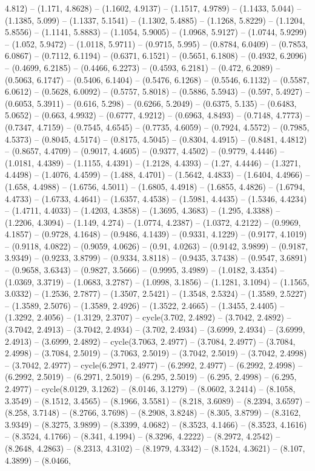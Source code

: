 4.812) -- (1.171, 4.8628) -- (1.1602, 4.9137) -- (1.1517, 4.9789) -- (1.1433, 5.044) -- (1.1385, 5.099) -- (1.1337, 5.1541) -- (1.1302, 5.4885) -- (1.1268, 5.8229) -- (1.1204, 5.8556) -- (1.1141, 5.8883) -- (1.1054, 5.9005) -- (1.0968, 5.9127) -- (1.0744, 5.9299) -- (1.052, 5.9472) -- (1.0118, 5.9711) -- (0.9715, 5.995) -- (0.8784, 6.0409) -- (0.7853, 6.0867) -- (0.7112, 6.1194) -- (0.6371, 6.1521) -- (0.5651, 6.1808) -- (0.4932, 6.2096) -- (0.4699, 6.2185) -- (0.4466, 6.2273) -- (0.4593, 6.2181) -- (0.472, 6.2089) -- (0.5063, 6.1747) -- (0.5406, 6.1404) -- (0.5476, 6.1268) -- (0.5546, 6.1132) -- (0.5587, 6.0612) -- (0.5628, 6.0092) -- (0.5757, 5.8018) -- (0.5886, 5.5943) -- (0.597, 5.4927) -- (0.6053, 5.3911) -- (0.616, 5.298) -- (0.6266, 5.2049) -- (0.6375, 5.135) -- (0.6483, 5.0652) -- (0.663, 4.9932) -- (0.6777, 4.9212) -- (0.6963, 4.8493) -- (0.7148, 4.7773) -- (0.7347, 4.7159) -- (0.7545, 4.6545) -- (0.7735, 4.6059) -- (0.7924, 4.5572) -- (0.7985, 4.5373) -- (0.8045, 4.5174) -- (0.8175, 4.5045) -- (0.8304, 4.4915) -- (0.8481, 4.4812) -- (0.8657, 4.4709) -- (0.9017, 4.4605) -- (0.9377, 4.4502) -- (0.9779, 4.4446) -- (1.0181, 4.4389) -- (1.1155, 4.4391) -- (1.2128, 4.4393) -- (1.27, 4.4446) -- (1.3271, 4.4498) -- (1.4076, 4.4599) -- (1.488, 4.4701) -- (1.5642, 4.4833) -- (1.6404, 4.4966) -- (1.658, 4.4988) -- (1.6756, 4.5011) -- (1.6805, 4.4918) -- (1.6855, 4.4826) -- (1.6794, 4.4733) -- (1.6733, 4.4641) -- (1.6357, 4.4538) -- (1.5981, 4.4435) -- (1.5346, 4.4234) -- (1.4711, 4.4033) -- (1.4203, 4.3858) -- (1.3695, 4.3683) -- (1.295, 4.3388) -- (1.2206, 4.3094) -- (1.149, 4.274) -- (1.0774, 4.2387) -- (1.0372, 4.2122) -- (0.9969, 4.1857) -- (0.9728, 4.1648) -- (0.9486, 4.1439) -- (0.9331, 4.1229) -- (0.9177, 4.1019) -- (0.9118, 4.0822) -- (0.9059, 4.0626) -- (0.91, 4.0263) -- (0.9142, 3.9899) -- (0.9187, 3.9349) -- (0.9233, 3.8799) -- (0.9334, 3.8118) -- (0.9435, 3.7438) -- (0.9547, 3.6891) -- (0.9658, 3.6343) -- (0.9827, 3.5666) -- (0.9995, 3.4989) -- (1.0182, 3.4354) -- (1.0369, 3.3719) -- (1.0683, 3.2787) -- (1.0998, 3.1856) -- (1.1281, 3.1094) -- (1.1565, 3.0332) -- (1.2536, 2.7877) -- (1.3507, 2.5421) -- (1.3548, 2.5324) -- (1.3589, 2.5227) -- (1.3589, 2.5076) -- (1.3589, 2.4926) -- (1.3522, 2.4665) -- (1.3455, 2.4405) -- (1.3292, 2.4056) -- (1.3129, 2.3707) -- cycle(3.702, 2.4892) -- (3.7042, 2.4892) -- (3.7042, 2.4913) -- (3.7042, 2.4934) -- (3.702, 2.4934) -- (3.6999, 2.4934) -- (3.6999, 2.4913) -- (3.6999, 2.4892) -- cycle(3.7063, 2.4977) -- (3.7084, 2.4977) -- (3.7084, 2.4998) -- (3.7084, 2.5019) -- (3.7063, 2.5019) -- (3.7042, 2.5019) -- (3.7042, 2.4998) -- (3.7042, 2.4977) -- cycle(6.2971, 2.4977) -- (6.2992, 2.4977) -- (6.2992, 2.4998) -- (6.2992, 2.5019) -- (6.2971, 2.5019) -- (6.295, 2.5019) -- (6.295, 2.4998) -- (6.295, 2.4977) -- cycle(8.0129, 3.1262) -- (8.0146, 3.1279) -- (8.0602, 3.2414) -- (8.1058, 3.3549) -- (8.1512, 3.4565) -- (8.1966, 3.5581) -- (8.218, 3.6089) -- (8.2394, 3.6597) -- (8.258, 3.7148) -- (8.2766, 3.7698) -- (8.2908, 3.8248) -- (8.305, 3.8799) -- (8.3162, 3.9349) -- (8.3275, 3.9899) -- (8.3399, 4.0682) -- (8.3523, 4.1466) -- (8.3523, 4.1616) -- (8.3524, 4.1766) -- (8.341, 4.1994) -- (8.3296, 4.2222) -- (8.2972, 4.2542) -- (8.2648, 4.2863) -- (8.2313, 4.3102) -- (8.1979, 4.3342) -- (8.1524, 4.3621) -- (8.107, 4.3899) -- (8.0466, 